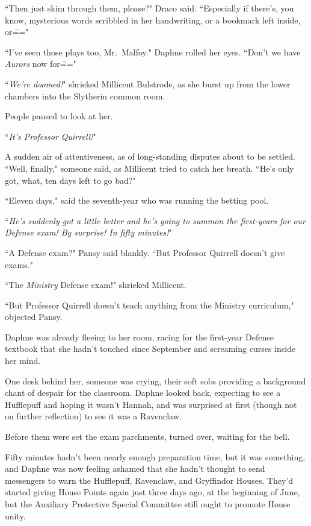 ``Then just skim through them, please?" Draco said. ``Especially if there's, you know, mysterious words scribbled in her handwriting, or a bookmark left inside, or\==="

``I've seen those plays too, Mr.~Malfoy." Daphne rolled her eyes. ``Don't we have \emph{Aurors} now for\==="

``\emph{We're doomed!}" shrieked Millicent Bulstrode, as she burst up from the lower chambers into the Slytherin common room.

People paused to look at her.

``\emph{It's Professor Quirrell!}"

A sudden air of attentiveness, as of long-standing disputes about to be settled. ``Well, finally," someone said, as Millicent tried to catch her breath. ``He's only got, what, ten days left to go bad?"

``Eleven days," said the seventh-year who was running the betting pool.

``\emph{He's suddenly got a little better and he's going to summon the first-years for our Defense exam! By surprise! In fifty minutes!}"

``A Defense exam?" Pansy said blankly. ``But Professor Quirrell doesn't give exams."

``The \emph{Ministry} Defense exam!" shrieked Millicent.

``But Professor Quirrell doesn't teach anything from the Ministry curriculum," objected Pansy.

Daphne was already fleeing to her room, racing for the first-year Defense textbook that she hadn't touched since September and screaming curses inside her mind.

\later

One desk behind her, someone was crying, their soft sobs providing a background chant of despair for the classroom. Daphne looked back, expecting to see a Hufflepuff and hoping it wasn't Hannah, and was surprised at first (though not on further reflection) to see it was a Ravenclaw.

Before them were set the exam parchments, turned over, waiting for the bell.

Fifty minutes hadn't been nearly enough preparation time, but it was something, and Daphne was now feeling ashamed that she hadn't thought to send messengers to warn the Hufflepuff, Ravenclaw, and Gryffindor Houses. They'd started giving House Points again just three days ago, at the beginning of June, but the Auxiliary Protective Special Committee still ought to promote House unity.

